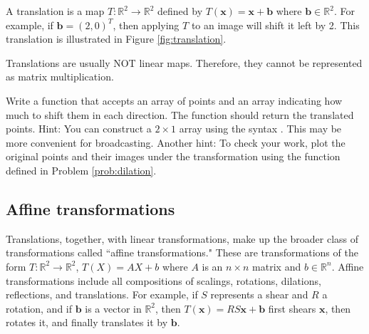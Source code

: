 A translation is a map $T: \mathbb{R}^2 \rightarrow \mathbb{R}^2$ defined by $T(\mathbf{x}) = \mathbf{x}+\mathbf{b}$ where $\mathbf{b} \in \mathbb{R}^2$. For example, if $\mathbf{b} = (2, 0)^T$, then applying $T$ to an image will shift it left by 2. This translation is illustrated in Figure \ref{fig:translation}.


Translations are usually NOT linear maps. Therefore, they cannot be represented as matrix multiplication.

\begin{problem}
Write a function that accepts an array of points and an array indicating how much to shift them in each direction. The function should return the translated points. 
Hint: You can construct a $2 \times 1$ array using the syntax . This may be more convenient for broadcasting. Another hint: To check your work, plot the original points and their images under the transformation using the function  defined in Problem \ref{prob:dilation}.
\end{problem}

\subsection*{Affine transformations}
Translations, together, with linear transformations, make up the broader class of transformations called
``affine transformations." These are transformations of the form $T: \mathbb{R}^2 \to \mathbb{R}^2$, $T(X) = AX + b$ where $A$ is an $n\times n$ matrix and $b \in \mathbb{R}^n$. Affine transformations include all compositions of scalings, rotations, dilations, reflections, and translations. For example, if $S$ represents a shear and $R$ a rotation, and if $\mathbf{b}$ is a vector in $\mathbb{R}^2$, then $T(\mathbf{x}) = RS\mathbf{x} + \mathbf{b}$ first shears $\mathbf{x}$, then rotates it, and finally translates it by $\mathbf{b}$. 


